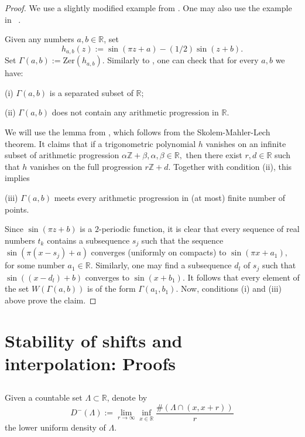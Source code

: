 \documentclass[12pt]{amsart}
\numberwithin{equation}{section}
\newcommand{\R}{{\mathbb R}} \newcommand{\Q}{{\mathbb Q}} \newcommand{\Z}{{\mathbb Z}} \newcommand{\N}{{\mathbb N}}
\begin{document}
 \begin{proof}
      We use a slightly modified example from \cite{MR4206541}. One may also use the example in ~\cite{MR4129870}.

Given any numbers $a, b\in\R$, set $$h_{a,b}(z):=\sin(\pi z+a)-(1/2) \sin(z+b). $$ Set  $\Gamma(a,b):=$Zer$(h_{a,b})$.  Similarly to \cite{MR4206541}, one can check that for every $a,b$ we have:

(i) $\Gamma(a,b)$ is a separated subset of $\R$;

(ii)  $\Gamma(a,b)$ does not contain any arithmetic progression in $\R$.

We will use the lemma from \cite[Section~4]{MR379387}, which follows from the Skolem-Mahler-Lech theorem. It claims that if a trigonometric polynomial $h$ vanishes on an infinite subset of arithmetic progression $\alpha \Z + \beta, \alpha,\beta\in \R,$ then there exist $r,d \in \R$ such that $h$ vanishes on the full progression $r\Z + d$. 
Together with condition (ii), this implies 

(iii) $\Gamma(a,b)$ meets every arithmetic progression in (at most) finite number of points.

Since $\sin(\pi z+b)$ is a $2$-periodic function, it is clear that  every sequence of real numbers $t_k$ contains a subsequence $s_{j}$ such that the sequence $\sin (\pi (x-s_{j})+a)$ converges (uniformly on compacts) to  $\sin (\pi x+ a_1),$ for some number $ a_1\in\R.$ Similarly, one may find a subsequence $d_{l}$ of $s_{j}$ such that $\sin((x-d_l)+b)$ converges to $\sin(x+b_1).$ It follows that every element of the set  $W(\Gamma(a,b))$ is of the form $\Gamma(a_1,b_1)$. Now, conditions (i) and (iii) above prove the claim. \end{proof}





\section{Stability of shifts and interpolation: Proofs}\label{sec_proofs1}

\subsection{}\label{sect_lemma_above_proof}
Given a countable set $\Lambda\subset\R$, denote by 
\begin{equation}\label{lud}D^-(\Lambda):=\lim_{r\to\infty}\inf_{x\in\R}\frac{\#(\Lambda\cap (x,x+r))}{r}\end{equation}the lower uniform density of $\Lambda$.
\end{document}

